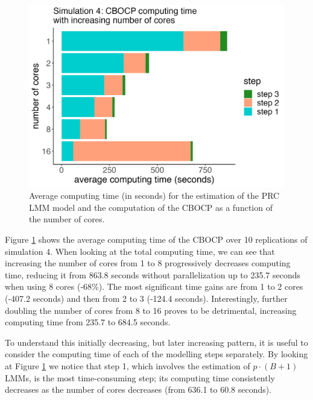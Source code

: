 \begin{Schunk}
\begin{figure}[htbp]

{\centering \includegraphics[width=4.5in]{comptime_sim4b} 

}

\caption[Average computing time (in seconds) for the estimation of the PRC LMM model and the computation of the CBOCP as a function of the number of cores]{Average computing time (in seconds) for the estimation of the PRC LMM model and the computation of the CBOCP as a function of the number of cores.}\label{fig:ctime4}
\end{figure}
\end{Schunk}

Figure \ref{fig:ctime4} shows the average computing time of the CBOCP
over 10 replications of simulation 4. When looking at the total
computing time, we can see that increasing the number of cores from 1 to
8 progressively decreases computing time, reducing it from 863.8 seconds
without parallelization up to 235.7 seconds when using 8 cores (-68\%).
The most significant time gains are from 1 to 2 cores (-407.2 seconds)
and then from 2 to 3 (-124.4 seconds). Interestingly, further doubling
the number of cores from 8 to 16 proves to be detrimental, increasing
computing time from 235.7 to 684.5 seconds.

To understand this initially decreasing, but later increasing pattern,
it is useful to consider the computing time of each of the modelling
steps separately. By looking at Figure \ref{fig:ctime4} we notice that
step 1, which involves the estimation of \(p \cdot (B+1)\) LMMs, is the
most time-consuming step; its computing time consistently decreases as
the number of cores decreases (from 636.1 to 60.8 seconds).

